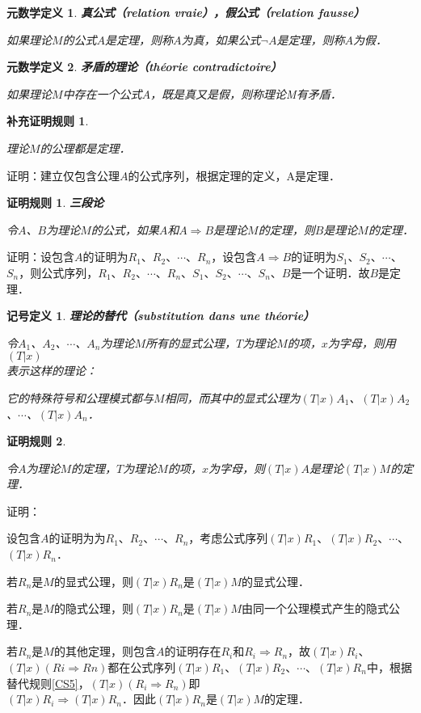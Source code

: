 \documentclass[12pt, a4paper, oneside]{book}
\newtheorem{metadef}{元数学定义}
\newtheorem{sign}{记号定义}
\newtheorem{C}{证明规则}
\newtheorem{Ccor}{补充证明规则}
\begin{document}
			\begin{metadef}
				\textbf{真公式（relation vraie），假公式（relation fausse）}
				\par
				如果理论$M$的公式$A$是定理，则称$A$为真，如果公式$\neg A$是定理，则称$A$为假．
			\end{metadef}

			\begin{metadef}
				\textbf{矛盾的理论（théorie contradictoire）}
				\par
				如果理论$M$中存在一个公式$A$，既是真又是假，则称理论M有矛盾．
			\end{metadef}

			\begin{Ccor}\label{Ccor1}
				\hfill\par
				理论$M$的公理都是定理．
			\end{Ccor}
			证明：建立仅包含公理$A$的公式序列，根据定理的定义，A是定理．

			\begin{C}\label{C1}
				\textbf{三段论}
				\par
				令$A$、$B$为理论$M$的公式，如果$A$和$A\Rightarrow B$是理论$M$的定理，则$B$是理论$M$的定理．
			\end{C}
			证明：设包含$A$的证明为$R_1$、$R_2$、$\cdots$、$R_n$，设包含$A\Rightarrow B$的证明为$S_1$、$S_2$、$\cdots$、$S_n$，则公式序列，$R_1$、$R_2$、$\cdots$、$R_n$、$S_1$、$S_2$、$\cdots$、$S_n$、$B$是一个证明．故$B$是定理．

			\begin{sign}
				\textbf{理论的替代（substitution dans une théorie）}
				\par
				令$A_1$、$A_2$、$\cdots$、$A_n$为理论$M$所有的显式公理，$T$为理论$M$的项，$x$为字母，则用$(T|x)$\\表示这样的理论：
				\par
				它的特殊符号和公理模式都与$M$相同，而其中的显式公理为$(T|x)A_1$、$(T|x)A_2$、$\cdots$、$(T|x)A_n$．
			\end{sign}

			\begin{C}\label{C2}
				\hfill\par
				令$A$为理论$M$的定理，$T$为理论$M$的项，$x$为字母，则$(T|x)A$是理论$(T|x)M$的定理．
			\end{C}
			证明：
			\par
			设包含$A$的证明为为$R_1$、$R_2$、$\cdots$、$R_n$，考虑公式序列$(T|x)R_1$、$(T|x)R_2$、$\cdots$、\\$(T|x)R_n$．
			\par
			若$R_n$是$M$的显式公理，则$(T|x)R_n$是$(T|x)M$的显式公理．
			\par
			若$R_n$是$M$的隐式公理，则$(T|x)R_n$是$(T|x)M$由同一个公理模式产生的隐式公理．
			\par
			若$R_n$是$M$的其他定理，则包含$A$的证明存在$R_i$和$R_i\Rightarrow R_n$，故$(T|x)R_i$、$(T|x)(Ri\Rightarrow Rn)$都在公式序列$(T|x)R_1$、$(T|x)R_2$、$\cdots$、$(T|x)R_n$中，根据替代规则\ref{CS5}，$(T|x)(R_i\Rightarrow R_n)$即\\$(T|x)R_i\Rightarrow (T|x)R_n$．因此$(T|x)R_n$是$(T|x)M$的定理．
\end{document}
